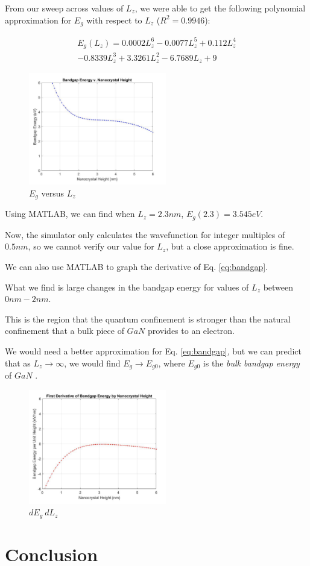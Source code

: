 \documentclass{IEEEtran}
\begin{document}
From our sweep across values of \(L_z\), we were able to get the following polynomial approximation for \(E_g\) with respect to \(L_z\) (\(R^2 = 0.9946\)):

\begin{multline} \label{eq:bandgap}
    E_g(L_z) = 0.0002 L_z^6 - 0.0077 L_z^5 + 0.112 L_z^4 \\ - 0.8339 L_z^3 + 3.3261 L_z^2 - 6.7689 L_z + 9
\end{multline}

\begin{figure}[!h]
    \centering
    \includegraphics*[width = 6cm]{EgVLz.png}
    \caption{\(E_g\) versus \(L_z\)}
\end{figure}    

Using MATLAB, we can find when \(L_z = 2.3nm\), \(E_g(2.3) = 3.545eV\).

Now, the simulator only calculates the wavefunction for integer multiples of \(0.5nm\), so we cannot verify our value for \(L_z\), but a close approximation is fine. 


We can also use MATLAB to graph the derivative of Eq. \ref{eq:bandgap}. 

What we find is large changes in the bandgap energy for values of \(L_z\) between \(0nm - 2nm\).

This is the region that the quantum confinement is stronger than the natural confinement that a bulk piece of \(GaN\) provides to an electron. 

We would need a better approximation for Eq. \ref{eq:bandgap}, but we can predict that as \(L_z \to \infty\), we would find \(E_g \to E_{g0}\), where \(E_{g0}\) is the \textit{bulk bandgap energy} of \(GaN\) .

\begin{figure}[!h] \label{fig:derivative}
    \centering
    \includegraphics*[width = 6cm]{derivativeOfEgVLz.png}
    \caption{\(dE_g \ dL_z\)}
\end{figure}    





\section{Conclusion}






\end{document}
